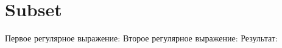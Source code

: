 \section{Subset}
\begin{frame}{}
	Первое регулярное выражение:
Второе регулярное выражение:
	Результат:
\end{frame}
